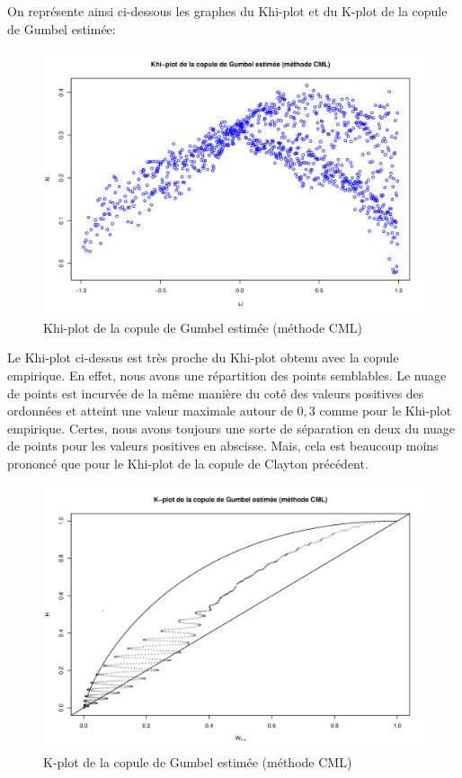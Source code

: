 On représente ainsi ci-dessous les graphes du Khi-plot et du K-plot de la copule de Gumbel estimée:

\noindent%
\begin{figure}[H]
    \begin{center}
      \includegraphics[width=17 cm, angle=0]{./pictures/gumbelcmlkhiplot.png}
      \centering\caption{\label{2}Khi-plot de la copule de Gumbel estimée (méthode CML)}
    \end{center}
\end{figure}

Le Khi-plot ci-dessus est très proche du Khi-plot obtenu avec la copule empirique. En effet, nous avons une répartition des points semblables. Le nuage de points est incurvée de la même manière du coté des valeurs positives des ordonnées et atteint une valeur maximale autour de $0,3$ comme pour le Khi-plot empirique. Certes, nous avons toujours une sorte de séparation en deux du nuage de points pour les valeurs positives en abscisse. Mais, cela est beaucoup moins prononcé que pour le Khi-plot de la copule de Clayton précédent.

\noindent%
\begin{figure}[H]
    \begin{center}
      \includegraphics[width=17 cm, angle=0]{./pictures/gumbelcmlkplot.png}
      \centering\caption{\label{2}K-plot de la copule de Gumbel estimée (méthode CML)}
    \end{center}
\end{figure}

